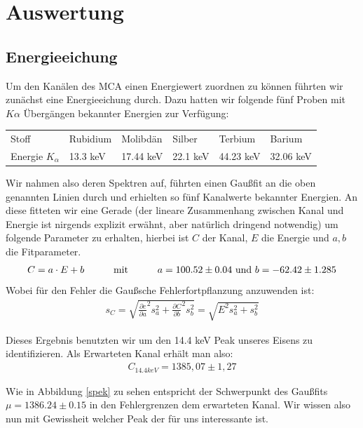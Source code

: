 \documentclass[12pt]{article}
\begin{document}
\section{Auswertung}
\subsection{Energieeichung}

Um den Kanälen des MCA einen Energiewert zuordnen zu können führten wir zunächst eine Energieeichung durch. Dazu hatten wir folgende fünf Proben mit $K\alpha$ Übergängen
bekannter Energien zur Verfügung:

\begin{center}
\begin{tabular}{|l|l|l|l|l|l|}
\hline
Stoff & Rubidium & Molibdän & Silber & Terbium & Barium\\
Energie $K_{\alpha}$ & 13.3 keV & 17.44 keV & 22.1 keV & 44.23 keV & 32.06 keV \\
\hline
\end{tabular}
\end{center}
Wir nahmen also deren Spektren auf, führten einen Gaußfit an die oben genannten Linien durch und erhielten so fünf Kanalwerte bekannter Energien. An diese fitteten 
wir eine Gerade (der lineare Zusammenhang zwischen Kanal und Energie ist nirgends explizit erwähnt, aber natürlich dringend notwendig) um folgende Parameter
zu erhalten, hierbei ist $C$ der Kanal, $E$ die Energie und $a,b$ die Fitparameter.
\begin{align*}
  C = a \cdot E + b \hspace{30pt} \textnormal{mit}\hspace{30pt}a = 100.52 \pm 0.04\textnormal{ und }b =  -62.42 \pm 1.285
\end{align*}
Wobei für den Fehler die Gaußsche Fehlerfortpflanzung anzuwenden ist:
\begin{align*}
  s_C = \sqrt{\frac{\partial{c}}{\partial{a}}^2 s_a^2 + \frac{\partial{C}}{\partial{b}}^2 s_b^2 } = \sqrt{E^2 s_a^2 + s_b^2}
\end{align*}

Dieses Ergebnis benutzten wir um den 14.4 keV Peak unseres Eisens zu identifizieren. Als Erwarteten Kanal erhält man also:
\begin{align*}
  C_{14.4keV} = 1385,07 \pm 1,27
\end{align*}

Wie in Abbildung \ref{spek} zu sehen entspricht der Schwerpunkt des Gaußfits $\mu=1386.24\pm0.15$ in den Fehlergrenzen dem erwarteten Kanal. Wir wissen also nun mit Gewissheit
welcher Peak der für uns interessante ist.
\end{document}
